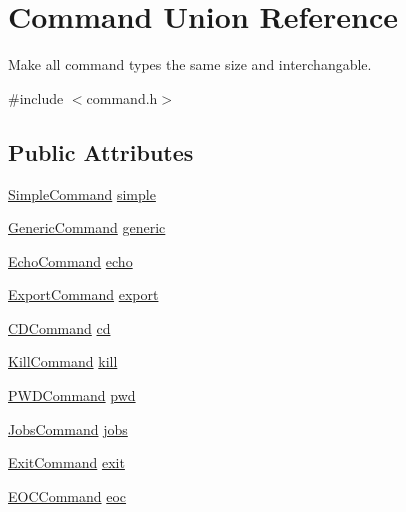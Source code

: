 \hypertarget{unionCommand}{}\section{Command Union Reference}
\label{unionCommand}


Make all command types the same size and interchangable.  




{\ttfamily \#include $<$command.\+h$>$}

\subsection*{Public Attributes}
\begin{DoxyCompactItemize}
\item 
\hyperlink{structSimpleCommand}{Simple\+Command} \hyperlink{unionCommand_a269da4d9b16689de14a0ec83636b59e8}{simple}
\item 
\hyperlink{structGenericCommand}{Generic\+Command} \hyperlink{unionCommand_a22a7dad0e3935c261a1643c8c5ea46aa}{generic}
\item 
\hyperlink{command_8h_a8dc22d719c880c1ffcd9bc2dc5773633}{Echo\+Command} \hyperlink{unionCommand_a74de4769cc35dac9a3f7dfd24cb87ad7}{echo}
\item 
\hyperlink{structExportCommand}{Export\+Command} \hyperlink{unionCommand_a57e7a8eb0763aa7105d3bc6a52e59da3}{export}
\item 
\hyperlink{structCDCommand}{C\+D\+Command} \hyperlink{unionCommand_a488c8f6e6ce10f7c9126f37c5f37776d}{cd}
\item 
\hyperlink{structKillCommand}{Kill\+Command} \hyperlink{unionCommand_a19c5261961f2f9a7fcbf9f5379d3f98a}{kill}
\item 
\hyperlink{command_8h_a0c0e44e3e2b07b1e9b48023205cb4ca2}{P\+W\+D\+Command} \hyperlink{unionCommand_a34fc21bb2a7fee2df4d3674b9d8166ff}{pwd}
\item 
\hyperlink{command_8h_a027de4ed5fe4b0313c6c8ee0c2c1806b}{Jobs\+Command} \hyperlink{unionCommand_abeb4905f11baf90a800fe211dd5ecdc9}{jobs}
\item 
\hyperlink{command_8h_a354cb87bc40859e5595de56b675732bc}{Exit\+Command} \hyperlink{unionCommand_ab516bde009e6b06c4b342d7f5bf35ece}{exit}
\item 
\hyperlink{command_8h_ae5bf5cf7a34428c221f28179034dd125}{E\+O\+C\+Command} \hyperlink{unionCommand_a062a1645e04deb34460595c902a49c44}{eoc}
\end{DoxyCompactItemize}


